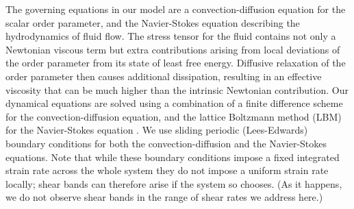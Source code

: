 \documentclass[8.5pt,twoside,twocolumn]{article}
\begin{document}
The governing equations in our model are a convection-diffusion equation
for the scalar order parameter, and the Navier-Stokes equation describing
the hydrodynamics of fluid flow. The stress tensor for the fluid contains not only a Newtonian viscous term but extra contributions arising from local deviations of the order parameter from its state of least free energy. Diffusive relaxation of the order parameter then causes additional dissipation, resulting in an effective viscosity that can be much higher than the intrinsic Newtonian contribution.
Our dynamical equations are solved using a combination of a finite
difference scheme for the convection-diffusion equation, and the
lattice Boltzmann method (LBM)~\cite{Succi} for the Navier-Stokes equation \cite{Marenduzzo07, Henrich10a,  Henrich10b, Henrich11a,Gonnella97}.
We use sliding periodic (Lees-Edwards) boundary conditions for
both the convection-diffusion and the Navier-Stokes equations. Note that while these boundary conditions impose a fixed integrated strain rate across the whole system they do not impose a uniform strain rate locally; shear bands can therefore arise if the system so chooses. (As it happens, we do not observe shear bands in the range of shear rates we address here.)




\end{document}
